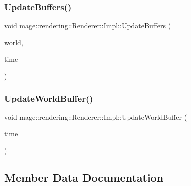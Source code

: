 \subsubsection{\texorpdfstring{Update\+Buffers()}{UpdateBuffers()}}
{\footnotesize\ttfamily void mage\+::rendering\+::\+Renderer\+::\+Impl\+::\+Update\+Buffers (\begin{DoxyParamCaption}\item[{const \hyperlink{classmage_1_1rendering_1_1_world}{World} \&}]{world,  }\item[{const \hyperlink{classmage_1_1_game_time}{Game\+Time} \&}]{time }\end{DoxyParamCaption})\hspace{0.3cm}{\ttfamily [private]}}

\hypertarget{classmage_1_1rendering_1_1_renderer_1_1_impl_abe65d2d48affa6a7c83104944b4737d7}{}\label{classmage_1_1rendering_1_1_renderer_1_1_impl_abe65d2d48affa6a7c83104944b4737d7} 
\subsubsection{\texorpdfstring{Update\+World\+Buffer()}{UpdateWorldBuffer()}}
{\footnotesize\ttfamily void mage\+::rendering\+::\+Renderer\+::\+Impl\+::\+Update\+World\+Buffer (\begin{DoxyParamCaption}\item[{const \hyperlink{classmage_1_1_game_time}{Game\+Time} \&}]{time }\end{DoxyParamCaption})\hspace{0.3cm}{\ttfamily [private]}}



\subsection{Member Data Documentation}
\hypertarget{classmage_1_1rendering_1_1_renderer_1_1_impl_aeb6351e4bacece7f3682685d74593d18}{}\label{classmage_1_1rendering_1_1_renderer_1_1_impl_aeb6351e4bacece7f3682685d74593d18} 

